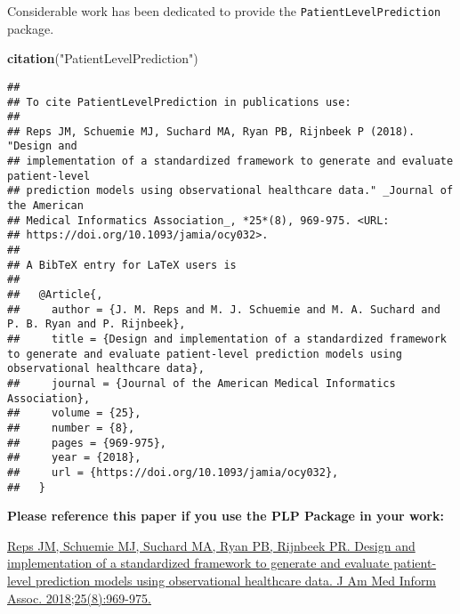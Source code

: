 \documentclass[
]{article}
\newenvironment{Shaded}{\begin{snugshade}}{\end{snugshade}}
\newcommand{\KeywordTok}[1]{\textcolor[rgb]{0.13,0.29,0.53}{\textbf{#1}}}
\newcommand{\NormalTok}[1]{#1}
\newcommand{\StringTok}[1]{\textcolor[rgb]{0.31,0.60,0.02}{#1}}
\begin{document}
Considerable work has been dedicated to provide the
\texttt{PatientLevelPrediction} package.

\begin{Shaded}
\begin{Highlighting}[]
\KeywordTok{citation}\NormalTok{(}\StringTok{"PatientLevelPrediction"}\NormalTok{)}
\end{Highlighting}
\end{Shaded}

\begin{verbatim}
## 
## To cite PatientLevelPrediction in publications use:
## 
## Reps JM, Schuemie MJ, Suchard MA, Ryan PB, Rijnbeek P (2018). "Design and
## implementation of a standardized framework to generate and evaluate patient-level
## prediction models using observational healthcare data." _Journal of the American
## Medical Informatics Association_, *25*(8), 969-975. <URL:
## https://doi.org/10.1093/jamia/ocy032>.
## 
## A BibTeX entry for LaTeX users is
## 
##   @Article{,
##     author = {J. M. Reps and M. J. Schuemie and M. A. Suchard and P. B. Ryan and P. Rijnbeek},
##     title = {Design and implementation of a standardized framework to generate and evaluate patient-level prediction models using observational healthcare data},
##     journal = {Journal of the American Medical Informatics Association},
##     volume = {25},
##     number = {8},
##     pages = {969-975},
##     year = {2018},
##     url = {https://doi.org/10.1093/jamia/ocy032},
##   }
\end{verbatim}

\textbf{Please reference this paper if you use the PLP Package in your
work:}

\href{http://dx.doi.org/10.1093/jamia/ocy032}{Reps JM, Schuemie MJ,
Suchard MA, Ryan PB, Rijnbeek PR. Design and implementation of a
standardized framework to generate and evaluate patient-level prediction
models using observational healthcare data. J Am Med Inform Assoc.
2018;25(8):969-975.}
\end{document}
